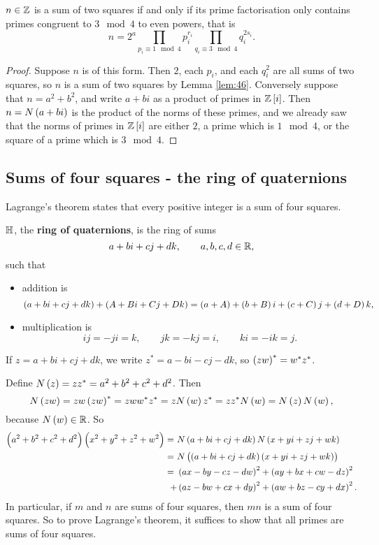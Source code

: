 \begin{theorem}
$ n \in \mathbb{Z} $ is a sum of two squares if and only if its prime factorisation only contains primes congruent to $ 3 \mod 4 $ to even powers, that is
$$ n = 2^a\prod_{p_i \equiv 1 \mod 4} p_i^{r_i}\prod_{q_i \equiv 3 \mod 4} q_i^{2s_i}. $$
\end{theorem}

\begin{proof}
Suppose $ n $ is of this form. Then $ 2 $, each $ p_i $, and each $ q_i^2 $ are all sums of two squares, so $ n $ is a sum of two squares by Lemma \ref{lem:46}. Conversely suppose that $ n = a^2 + b^2 $, and write $ a + bi $ as a product of primes in $ \Z\sbr{i} $. Then $ n = N\br{a + bi} $ is the product of the norms of these primes, and we already saw that the norms of primes in $ \Z\sbr{i} $ are either $ 2 $, a prime which is $ 1 \mod 4 $, or the square of a prime which is $ 3 \mod 4 $.
\end{proof}

\subsection{Sums of four squares - the ring of quaternions}

Lagrange's theorem states that every positive integer is a sum of four squares.

\begin{definition}
$ \mathbb{H} $, the \textbf{ring of quaternions}, is the ring of sums
$$ a + bi + cj + dk, \qquad a, b, c, d \in \mathbb{R}, $$
such that
\begin{itemize}
\item addition is
$$ \br{a + bi + cj + dk} + \br{A + Bi + Cj + Dk} = \br{a + A} + \br{b + B}i + \br{c + C}j + \br{d + D}k, $$
\item multiplication is
$$ ij = -ji = k, \qquad jk = -kj = i, \qquad ki = -ik = j. $$
\end{itemize}
If $ z = a + bi + cj + dk $, we write $ z^* = a - bi - cj - dk $, so $ \br{zw}^* = w^*z^* $.
\end{definition}

Define $ N\br{z} = zz^* = a^2 + b^2 + c^2 + d^2 $. Then
$$ N\br{zw} = zw\br{zw}^* = zww^*z^* = zN\br{w}z^* = zz^*N\br{w} = N\br{z}N\br{w}, $$
because $ N\br{w} \in \R $. So
\begin{align*}
\br{a^2 + b^2 + c^2 + d^2}\br{x^2 + y^2 + z^2 + w^2}
= \ & N\br{a + bi + cj + dk}N\br{x + yi + zj + wk} \\
= \ & N\br{\br{a + bi + cj + dk}\br{x + yi + zj + wk}} \\
= \ & \br{ax - by - cz - dw}^2 + \br{ay + bx + cw - dz}^2 \\
+ & \br{az - bw + cx + dy}^2 + \br{aw + bz - cy + dx}^2.
\end{align*}
In particular, if $ m $ and $ n $ are sums of four squares, then $ mn $ is a sum of four squares. So to prove Lagrange's theorem, it suffices to show that all primes are sums of four squares.

